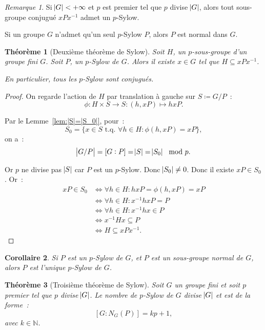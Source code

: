 \documentclass{article}
\newtheorem{thm}{Théorème}[section]
\newtheorem{cor}[thm]{Corollaire}
\theoremstyle{definition}
\theoremstyle{remark}
\newtheorem*{rmq}{Remarque}
\newcommand{\N}{\mathbb N}
\newcommand{\tq}{\text{ t.q. }}
\begin{document}
	\begin{rmq} Si $\abs G < +\infty$ et $p$ est premier tel que $p$ divise $\abs G$, alors tout sous-groupe conjugué $xPx^{-1}$ admet un $p$-Sylow.

	Si un groupe $G$ n'admet qu'un seul $p$-Sylow $P$, alors $P$ est normal dans $G$.
	\end{rmq}

	\begin{thm}[Deuxième théorème de Sylow] Soit $H$, un $p$-sous-groupe d'un groupe fini $G$. Soit $P$, un $p$-Sylow de $G$. Alors il existe $x \in G$ tel que
	$H \subseteq xPx^{-1}$.

	En particulier, tous les $p$-Sylow sont conjugués.
	\end{thm}

	\begin{proof} On regarde l'action de $H$ par translation à gauche sur $S \coloneqq G/P$~:
	\[\phi : H \times S \to S : (h, xP) \mapsto hxP.\]

	Par le Lemme~\ref{lem:|S|=|S_0|}, pour~:
	\[S_0 = \{x \in S \tq \forall h \in H : \phi(h, xP) = xP\},\]
	on a~:
	\[\abs {G/P} = [G:P] = \abs S = \abs {S_0} \mod p.\]

	Or $p$ ne divise pas $\abs S$ car $P$ est un $p$-Sylow. Donc $\abs {S_0} \neq 0$. Donc il existe $xP \in S_0$. Or~:
	\begin{align*}
		xP \in S_0 &\iff \forall h \in H : hxP = \phi(h, xP) = xP \\
		&\iff \forall h \in H : x^{-1}hxP = P \\
		&\iff \forall h \in H : x^{-1}hx \in P \\
		&\iff x^{-1}Hx \subseteq P \\
		&\iff H \subseteq xPx^{-1}.
	\end{align*}
	\end{proof}

	\begin{cor} Si $P$ est un $p$-Sylow de $G$, et $P$ est un sous-groupe normal de $G$, alors $P$ est l'unique $p$-Sylow de $G$.
	\end{cor}

	\begin{thm}[Troisième théorème de Sylow] Soit $G$ un groupe fini et soit $p$ premier tel que $p$ divise $\abs G$. Le nombre de $p$-Sylow de $G$ divise
	$\abs G$ et est de la forme~:
	\[[G:N_G(P)] = kp + 1,\]
	avec $k \in \N$.
	\end{thm}
\end{document}
